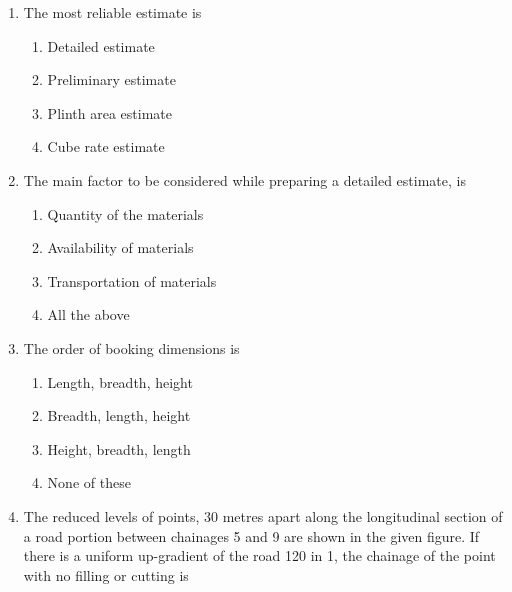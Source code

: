 \documentclass[11pt,a4paper]{article}
\begin{document}
\begin{enumerate}
{}
\\
\item{The most reliable estimate is}
\begin{enumerate}[label=\Alph*.]
\item{Detailed estimate}
\item{Preliminary estimate}
\item{Plinth area estimate}
\item{Cube rate estimate}
\end{enumerate}
\item{The main factor to be considered while preparing a detailed estimate, is}
\begin{enumerate}[label=\Alph*.]
\item{Quantity of the materials}
\item{Availability of materials}
\item{Transportation of materials}
\item{All the above}
\end{enumerate}
\item{The order of booking dimensions is}
\begin{enumerate}[label=\Alph*.]
\item{Length, breadth, height}
\item{Breadth, length, height}
\item{Height, breadth, length}
\item{None of these}
\end{enumerate}
\item{The reduced levels of points, 30 metres apart along the longitudinal section of a road portion between chainages 5 and 9 are shown in the given figure. If there is a uniform up-gradient of the road 120 in 1, the chainage of the point with no filling or cutting is \\

}
\end{enumerate}
\end{document}
